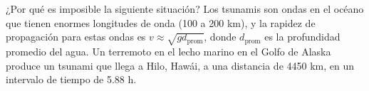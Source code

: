\item ¿Por qué es imposible la siguiente situación? Los tsunamis son ondas en el océano que tienen enormes longitudes de onda (100 a 200 km), y la rapidez de propagación para estas ondas es $v \approx \sqrt{g d_{\text{prom}}}$, donde $d_{\text{prom}}$ es la profundidad promedio del agua. Un terremoto en el lecho marino en el Golfo de Alaska produce un tsunami que llega a Hilo, Hawái, a una distancia de 4450 km, en un intervalo de tiempo de 5.88 h.